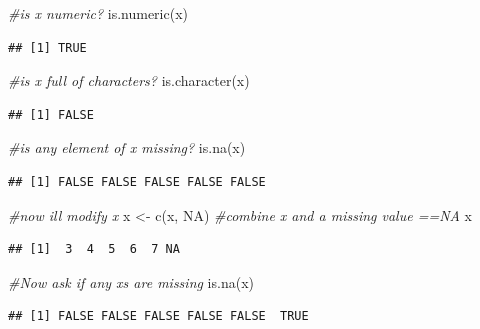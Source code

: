 \documentclass[
]{article}
\newenvironment{Shaded}{\begin{snugshade}}{\end{snugshade}}
\newcommand{\CommentTok}[1]{\textcolor[rgb]{0.56,0.35,0.01}{\textit{#1}}}
\newcommand{\ConstantTok}[1]{\textcolor[rgb]{0.00,0.00,0.00}{#1}}
\newcommand{\FunctionTok}[1]{\textcolor[rgb]{0.00,0.00,0.00}{#1}}
\newcommand{\NormalTok}[1]{#1}
\newcommand{\OtherTok}[1]{\textcolor[rgb]{0.56,0.35,0.01}{#1}}
\begin{document}
\begin{Shaded}
\begin{Highlighting}[]
\CommentTok{\#is x numeric?}
\FunctionTok{is.numeric}\NormalTok{(x)}
\end{Highlighting}
\end{Shaded}

\begin{verbatim}
## [1] TRUE
\end{verbatim}

\begin{Shaded}
\begin{Highlighting}[]
\CommentTok{\#is x full of characters?}
\FunctionTok{is.character}\NormalTok{(x)}
\end{Highlighting}
\end{Shaded}

\begin{verbatim}
## [1] FALSE
\end{verbatim}

\begin{Shaded}
\begin{Highlighting}[]
\CommentTok{\#is any element of x missing?}
\FunctionTok{is.na}\NormalTok{(x)}
\end{Highlighting}
\end{Shaded}

\begin{verbatim}
## [1] FALSE FALSE FALSE FALSE FALSE
\end{verbatim}

\begin{Shaded}
\begin{Highlighting}[]
\CommentTok{\#now i\textquotesingle{}ll modify x}
\NormalTok{x }\OtherTok{\textless{}{-}} \FunctionTok{c}\NormalTok{(x, }\ConstantTok{NA}\NormalTok{) }\CommentTok{\#combine x and a missing value ==NA}
\NormalTok{x}
\end{Highlighting}
\end{Shaded}

\begin{verbatim}
## [1]  3  4  5  6  7 NA
\end{verbatim}

\begin{Shaded}
\begin{Highlighting}[]
\CommentTok{\#Now ask if any x\textquotesingle{}s are missing}
\FunctionTok{is.na}\NormalTok{(x)}
\end{Highlighting}
\end{Shaded}

\begin{verbatim}
## [1] FALSE FALSE FALSE FALSE FALSE  TRUE
\end{verbatim}
\end{document}
